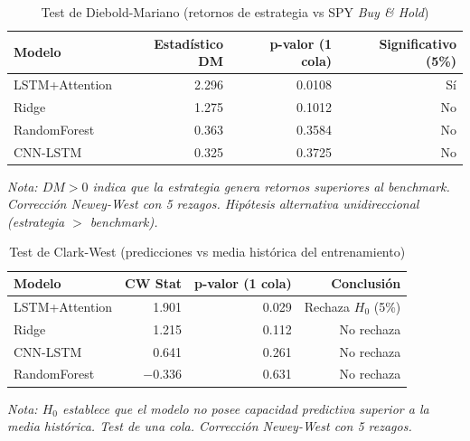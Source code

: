 \begin{table}[H]
\centering
\caption{Test de Diebold-Mariano (retornos de estrategia vs SPY \textit{Buy \& Hold})}
\label{tab:dm_test}
\small
\begin{tabular}{@{}lrrr@{}}
\toprule
\textbf{Modelo} & \textbf{Estad\'istico DM} & \textbf{p-valor (1 cola)} & \textbf{Significativo (5\%)} \\
\midrule
LSTM+Attention & 2.296 & 0.0108 & S\'i \\
Ridge & 1.275 & 0.1012 & No \\
RandomForest & 0.363 & 0.3584 & No \\
CNN-LSTM & 0.325 & 0.3725 & No \\
\bottomrule
\end{tabular}
\vspace{0.2cm}
\parbox{0.9\textwidth}{\footnotesize\textit{Nota: $DM > 0$ indica que la estrategia genera retornos superiores al \textit{benchmark}. Correcci\'on Newey-West con 5 rezagos. Hip\'otesis alternativa unidireccional (estrategia $>$ \textit{benchmark}).}}
\end{table}

\begin{table}[H]
\centering
\caption{Test de Clark-West (predicciones vs media hist\'orica del entrenamiento)}
\label{tab:cw_test}
\small
\begin{tabular}{@{}lrrr@{}}
\toprule
\textbf{Modelo} & \textbf{CW Stat} & \textbf{p-valor (1 cola)} & \textbf{Conclusi\'on} \\
\midrule
LSTM+Attention & 1.901 & 0.029 & Rechaza $H_0$ (5\%) \\
Ridge & 1.215 & 0.112 & No rechaza \\
CNN-LSTM & 0.641 & 0.261 & No rechaza \\
RandomForest & $-$0.336 & 0.631 & No rechaza \\
\bottomrule
\end{tabular}
\vspace{0.2cm}
\parbox{0.9\textwidth}{\footnotesize\textit{Nota: $H_0$ establece que el modelo no posee capacidad predictiva superior a la media hist\'orica. Test de una cola. Correcci\'on Newey-West con 5 rezagos.}}
\end{table}

